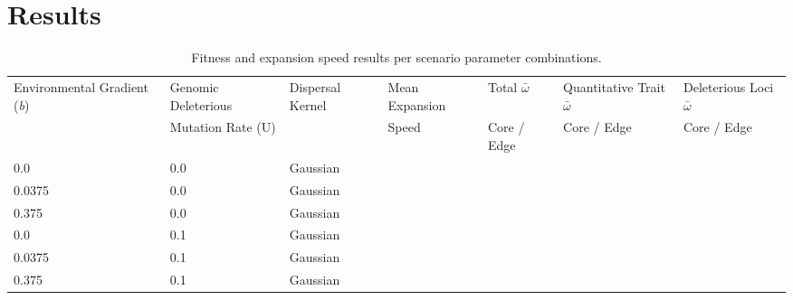 \section{Results}

\begin{table}[]
\centering \footnotesize
\caption{Fitness and expansion speed results per scenario parameter combinations.}
\label{tab:paramresults}
\begin{tabular}{p{}|p{}|p{}|p{}|p{}|p{}|p{}}
Environmental Gradient (\emph{b}) & Genomic Deleterious & Dispersal Kernel & Mean Expansion & Total $\bar{\omega}$	   & Quantitative Trait $\bar{\omega}$ & Deleterious Loci $\bar{\omega}$ \\
								  & Mutation Rate (U) 	&				   & Speed 			& \scriptsize{Core / Edge} & \scriptsize{Core / Edge} 		   & \scriptsize{Core / Edge} \\ \hline \hline
0.0                        & 0.0                                   & Gaussian         &                      &                            &                                         &                                       \\
0.0375                     & 0.0                                   & Gaussian         &                      &                            &                                         &                                       \\
0.375                      & 0.0                                   & Gaussian         &                      &                            &                                         &                                       \\ \hline
0.0                        & 0.1                                   & Gaussian         &                      &                            &                                         &                                       \\
0.0375                     & 0.1                                   & Gaussian         &                      &                            &                                         &                                       \\
0.375                      & 0.1                                   & Gaussian         &                      &                            &                                         &                                       \\ \hline

\end{tabular}
\end{table}
